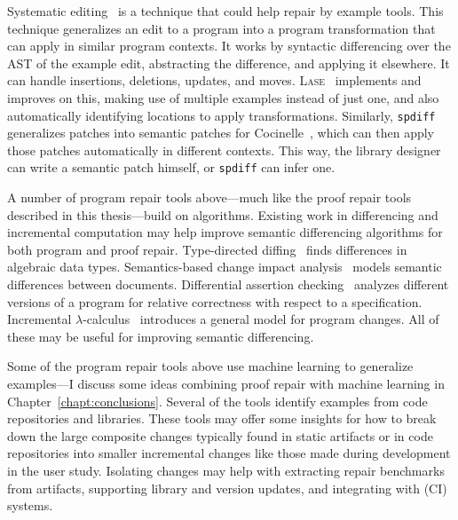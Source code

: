 Systematic editing~\cite{meng2011systematic} is a technique that could help repair by example tools.
This technique generalizes an edit to a program into a program transformation that can apply in similar program contexts.
It works by syntactic differencing over the AST of the example edit, abstracting the difference, and applying it elsewhere.
It can handle insertions, deletions, updates, and moves.
\textsc{Lase}~\cite{meng2013lase} implements and improves on this,
making use of multiple examples instead of just one, %
and also automatically identifying locations to apply transformations.
Similarly, \lstinline{spdiff}~\cite{andersen2010generic} generalizes patches into semantic patches for Cocinelle~\cite{padioleau2008documenting},
which can then apply those patches automatically in different contexts. This way, the library designer can write a semantic patch
himself, or \lstinline{spdiff} can infer one.

A number of program repair tools above---much like the proof repair tools described in this thesis---build on  algorithms.
Existing work in differencing and incremental computation may help 
improve semantic differencing algorithms for both program and proof repair.
Type-directed diffing~\cite{Miraldo:2017:TDS:3122975.3122976}
finds differences in algebraic data types.
Semantics-based change impact analysis~\cite{Autexier:2010:SCI:1860559.1860580} models semantic differences
between documents.
Differential assertion checking~\cite{differential-assertion-checking-2} analyzes different
versions of a program for relative correctness with respect to a specification.
Incremental $\lambda$-calculus~\cite{Cai:2014:TCH:2594291.2594304} introduces a general model for program changes.
All of these may be useful for improving semantic differencing.

Some of the program repair tools above use machine learning to generalize examples---I discuss some ideas combining proof repair
with machine learning in Chapter~\ref{chapt:conclusions}.
Several of the tools identify examples from code repositories and libraries.
These tools may offer some insights for how to break down the large composite changes typically found in static artifacts or in code repositories
into smaller incremental changes like those made during development in the  user study.
Isolating changes may help with extracting repair benchmarks from artifacts, supporting library and version
updates, and integrating with  (CI) systems.

